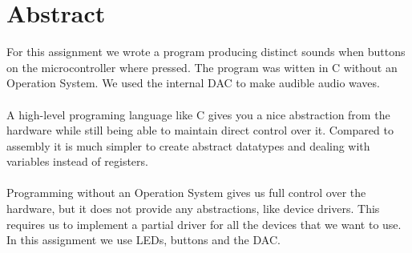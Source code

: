 \section{Abstract}
For this assignment we wrote a program producing distinct sounds when buttons on the microcontroller
where pressed. The program was witten in C without an Operation System. We used the internal DAC to make audible audio waves.\\
\\
A high-level programing language like C gives you a nice abstraction from the hardware while still
being able to maintain direct control over it. Compared to assembly it is much simpler to create abstract datatypes and
dealing with variables instead of registers.\\
\\
Programming without an Operation System gives us full control over the hardware, but it does not
provide any abstractions, like device drivers. This requires us to implement a partial driver for
all the devices that we want to use. In this assignment we use LEDs, buttons and the DAC.
